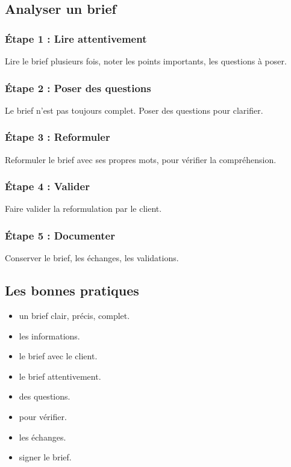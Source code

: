 \subsection{Analyser un brief}

\subsubsection{Étape 1 : Lire attentivement}

Lire le brief plusieurs fois, noter les points importants, les questions à poser.

\subsubsection{Étape 2 : Poser des questions}

Le brief n'est pas toujours complet. Poser des questions pour clarifier.

\subsubsection{Étape 3 : Reformuler}

Reformuler le brief avec ses propres mots, pour vérifier la compréhension.

\subsubsection{Étape 4 : Valider}

Faire valider la reformulation par le client.

\subsubsection{Étape 5 : Documenter}

Conserver le brief, les échanges, les validations.

\subsection{Les bonnes pratiques}

\begin{itemize}
    \item {} un brief clair, précis, complet.
    \item {} les informations.
    \item {} le brief avec le client.
    \item {} le brief attentivement.
    \item {} des questions.
    \item {} pour vérifier.
    \item {} les échanges.
    \item {} signer le brief.
\end{itemize}

